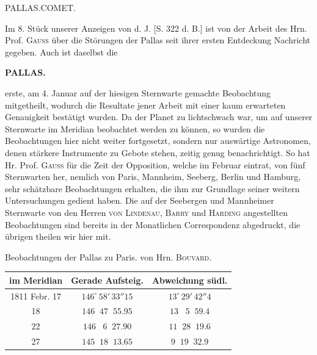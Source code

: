 \par{}\bigskip
\hypertarget{native-332-lower}{}\label{native-332-lower}
\begin{center}
\large PALLAS.\quad COMET.
\end{center}

\par\indent Im 8. Stück unserer Anzeigen von d. J. [S. 322 d. B.] ist von der Arbeit des Hrn. Prof. \textsc{Gauss} über die Störungen der Pallas seit ihrer ersten Entdeckung Nachricht gegeben. Auch ist daselbst die
\par
\clearpage
\thispagestyle{empty}
\noindent{}%
%
\parbox[t]{\dimexpr\linewidth-24mm\relax}{\centering\footnotesize\bfseries PALLAS.\par}%
\makebox[12mm][r]{}\par\nobreak\medskip
\noindent erste, am 4. Januar auf der hiesigen Sternwarte gemachte Beobachtung mitgetheilt, wodurch die Resultate jener Arbeit mit einer kaum erwarteten Genauigkeit bestätigt wurden. Da der Planet zu lichtschwach war, um auf unserer Sternwarte im Meridian beobachtet werden zu können, so wurden die Beobachtungen hier nicht weiter fortgesetzt, sondern nur auswärtige Astronomen, denen stärkere Instrumente zu Gebote stehen, zeitig genug benachrichtigt. So hat Hr. Prof. \textsc{Gauss} für die Zeit der Opposition, welche im Februar eintrat, von fünf Sternwarten her, nemlich von Paris, Mannheim, Seeberg, Berlin und Hamburg, sehr schätzbare Beobachtungen erhalten, die ihm zur Grundlage seiner weitern Untersuchungen gedient haben. Die auf der Seebergen und Mannheimer Sternwarte von den Herren \textsc{von Lindenau}, \textsc{Barry} und \textsc{Harding} angestellten Beobachtungen sind bereits in der Monatlichen Correspondenz abgedruckt, die übrigen theilen wir hier mit.

\begin{center}\fontsize{10}{12}\selectfont\setlength{\tabcolsep}{4pt}\renewcommand{\arraystretch}{1.15}
Beobachtungen der Pallas zu Paris. von Hrn. \textsc{Bouvard}.

\begin{tabular}{c|c|c}
im Meridian & Gerade Aufsteig. & Abweichung südl. \\
\hline
1811 Febr. 17 & $146^\circ\,58'\,33''15$ & $13^\circ\,29'\,42''4$ \\
18 & $146\;\;47\;\;55.95$ & $13\;\;\;5\;\;59.4$ \\
22 & $146\;\;\;6\;\;27.90$ & $11\;\;28\;\;19.6$ \\
27 & $145\;\;18\;\;13.65$ & $9\;\;19\;\;32.9$ \\
\end{tabular}
\end{center}

